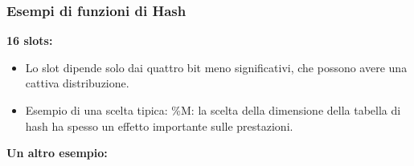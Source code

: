 \subsubsection{Esempi di funzioni di Hash}
\begin{tcolorbox}[width=15cm, boxsep=10pt]
    \textbf{16 slots:}
     
    \begin{itemize}
        \item Lo slot dipende solo dai quattro bit meno significativi, che
        possono avere una cattiva distribuzione.
        \item Esempio di una scelta tipica: \%M: la scelta della
        dimensione della tabella di hash ha spesso un effetto
        importante sulle prestazioni.
    \end{itemize}
\end{tcolorbox}
\newpage
\textbf{Un altro esempio:}
